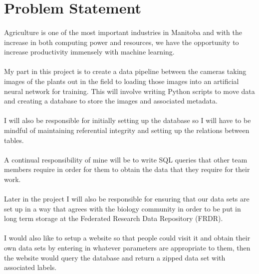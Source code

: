 \documentclass[12pt]{article}
\begin{document}
	\section{Problem Statement}
		\paragraph{}
			Agriculture is one of the most important industries in Manitoba and with the increase in both computing power and resources, we have the opportunity to increase productivity immensely with machine learning.
			
		\paragraph{}
			My part in this project is to create a data pipeline between the cameras taking images of the plants out in the field to loading those images into an artificial neural network for training.  This will involve writing Python scripts to move data and creating a database to store the images and associated metadata.
			
		\paragraph{}
			I will also be responsible for initially setting up the database so I will have to be mindful of maintaining referential integrity and setting up the relations between tables.
			
		\paragraph{}
			A continual responsibility of mine will be to write SQL queries that other team members require in order for them to obtain the data that they require for their work.
			
		\paragraph{}
			Later in the project I will also be responsible for ensuring that our data sets are set up in a way that agrees with the biology community in order to be put in long term storage at the Federated Research Data Repository (FRDR).
			
		\paragraph{}
			I would also like to setup a website so that people could visit it and obtain their own data sets by entering in whatever parameters are appropriate to them, then the website would query the database and return a zipped data set with associated labels.
	
\end{document}
